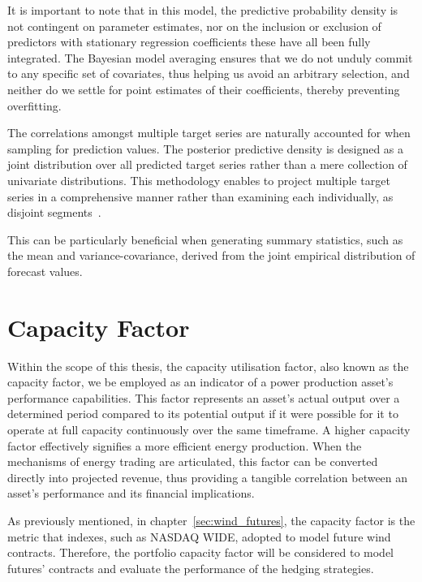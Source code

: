     It is important to note that in this model, the predictive probability density is not contingent on parameter estimates,
    nor on the inclusion or exclusion of predictors with stationary regression coefficients these have all been fully integrated.
    The Bayesian model averaging ensures that we do not unduly commit to any specific set of covariates,
    thus helping us avoid an arbitrary selection, and neither do we settle for point estimates of their coefficients,
    thereby preventing overfitting.

    The correlations amongst multiple target series are naturally accounted for when sampling for prediction values.
    The posterior predictive density is designed as a joint distribution over all predicted target series rather than a
    mere collection of univariate distributions.
    This methodology enables to project multiple target series in a comprehensive manner rather than examining each individually,
    as disjoint segments~\cite{qiu_multivariate_2018}.

    This can be particularly beneficial when generating summary statistics, such as the mean and variance-covariance,
    derived from the joint empirical distribution of forecast values.

\section{Capacity Factor}
    \label{sec:capacity_factor}

    Within the scope of this thesis, the capacity utilisation factor, also known as the capacity factor, we be employed
    as an indicator of a power production asset's performance capabilities.
    This factor represents an asset's actual output over a determined period compared to its potential output
    if it were possible for it to operate at full capacity continuously over the same timeframe.
    A higher capacity factor effectively signifies a more efficient energy production.
    When the mechanisms of energy trading are articulated, this factor can be converted directly into projected revenue,
    thus providing a tangible correlation between an asset’s performance and its financial implications.

    As previously mentioned, in chapter~\ref{sec:wind_futures},
    the capacity factor is the metric that indexes, such as NASDAQ WIDE, adopted to model future wind contracts.
    Therefore, the portfolio capacity factor will be considered to model futures' contracts and evaluate the
    performance of the hedging strategies.

